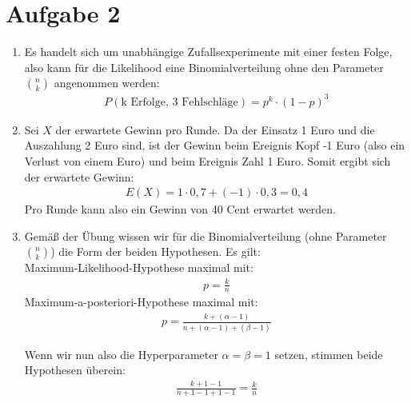 \documentclass[a4paper,10pt]{article}
\begin{document}
\section*{Aufgabe 2}
	\begin{enumerate}[~~a.)]
	 \item
	 Es handelt sich um unabhängige Zufallsexperimente mit einer festen Folge, also kann für die Likelihood eine Binomialverteilung ohne den Parameter $n \choose k$ angenommen werden:
	 \begin{align*}
	     P(\text{k Erfolge, 3 Fehlschläge}) = p^k \cdot (1-p)^3
	 \end{align*}
	 
	 \item
	     Sei $X$ der erwartete Gewinn pro Runde. Da der Einsatz 1 Euro und die Auszahlung 2 Euro sind, ist der Gewinn beim Ereignis Kopf -1 Euro (also ein Verlust von einem Euro) und beim Ereignis Zahl 1 Euro.
	     Somit ergibt sich der erwartete Gewinn:
	     \begin{align*}
	         E(X) = 1 \cdot 0,7 + (-1) \cdot 0,3 = 0,4
	     \end{align*}
	     Pro Runde kann also ein Gewinn von 40 Cent erwartet werden.
	     
	 \item
	 Gemäß der Übung wissen wir für die Binomialverteilung (ohne Parameter $n \choose k$) die Form der beiden Hypothesen. Es gilt: \\
	 Maximum-Likelihood-Hypothese maximal mit:
	 \begin{align*}
	     p = \frac{k}{n}
	 \end{align*}
	 Maximum-a-posteriori-Hypothese maximal mit:
	 \begin{align*}
	     p = \frac{k+(\alpha - 1)}{n+ (\alpha - 1)+(\beta -1)}
	 \end{align*}
	 
	 Wenn wir nun also die Hyperparameter $\alpha = \beta = 1$ setzen, stimmen beide Hypothesen überein:
	 \begin{align*}
	     \frac{ k + 1 -1}{n+1-1+1-1} = \frac{k}{n}
	 \end{align*}
	 

\end{enumerate}
\end{document}
